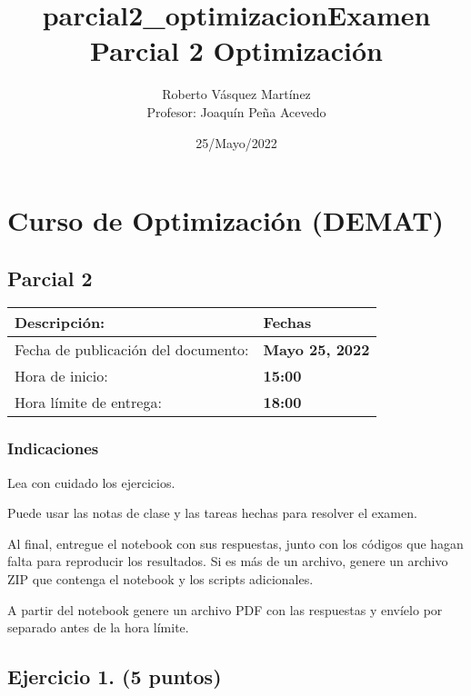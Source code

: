 \documentclass[11pt]{article}
\title{parcial2\_optimizacion}
\begin{document}
    
\title{Examen Parcial 2 Optimización}
\author{Roberto Vásquez Martínez \\ Profesor: Joaquín Peña Acevedo}
\date{25/Mayo/2022}
\maketitle 
    
    

    
    \hypertarget{curso-de-optimizaciuxf3n-demat}{%
\section{Curso de Optimización
(DEMAT)}\label{curso-de-optimizaciuxf3n-demat}}

\hypertarget{parcial-2}{%
\subsection{Parcial 2}\label{parcial-2}}

\begin{longtable}[]{@{}ll@{}}
\toprule
Descripción: & Fechas \\
\midrule
\endhead
Fecha de publicación del documento: & \textbf{Mayo 25, 2022} \\
Hora de inicio: & \textbf{15:00} \\
Hora límite de entrega: & \textbf{18:00} \\
\bottomrule
\end{longtable}

\hypertarget{indicaciones}{%
\subsubsection{Indicaciones}\label{indicaciones}}

Lea con cuidado los ejercicios.

Puede usar las notas de clase y las tareas hechas para resolver el
examen.

Al final, entregue el notebook con sus respuestas, junto con los códigos
que hagan falta para reproducir los resultados. Si es más de un archivo,
genere un archivo ZIP que contenga el notebook y los scripts
adicionales.

A partir del notebook genere un archivo PDF con las respuestas y envíelo
por separado antes de la hora límite.

    \hypertarget{ejercicio-1.-5-puntos}{%
\subsection{Ejercicio 1. (5 puntos)}\label{ejercicio-1.-5-puntos}}
\end{document}
